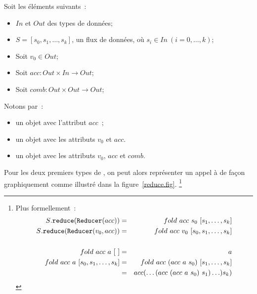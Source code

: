 Soit les \'el\'ements suivants~: 
\begin{itemize}
\item $In$ et $Out$ des types de donn\'ees;

\item $S = [s_0, s_1, \ldots, s_k]$, un flux de donn\'ees, o\`u $s_i
\in In~(i=0, \ldots, k)$;

\item Soit $v_0\in Out$;

\item Soit $acc: Out\times In \rightarrow Out$;

\item Soit $comb: Out\times Out \rightarrow Out$;

\end{itemize}

Notons par~:
\begin{itemize}
\item   {} un objet  avec l'attribut $acc$~; 
\item   {} un objet  avec les attributs $v_0$ et $acc$.
\item   {} un objet  avec les
attributs $v_0$, $acc$ et $comb$.
\end{itemize}

\bigskip

Pour les deux premiers types de , on peut alors
repr\'esenter un appel \`a  de fa\c{c}on graphiquement
comme illustr\'e dans la figure~\ref{reduce.fig}.%
%
\footnote{Plus formellement~:
%
\begin{eqnarray*}
S{\tt .reduce}({\tt Reducer}(acc)) 
  &=& fold\ acc\ s_0\ [s_1, \ldots, s_k]
\\
S{\tt .reduce}({\tt Reducer}(v_0, acc)) 
  &=& fold\ acc\ v_0\ [s_0, s_1, \ldots, s_k]
\\
\\
fold\ acc\ a\ [~]  
  &=& a
\\
fold\ acc\ a\ [s_0, s_1, \ldots, s_k] 
  &=& fold\ acc\ (acc\ a\ s_0)\ [s_1, \ldots, s_k]
\\
  &=& acc (\ldots (acc\ (acc\ a\ s_0)\ s_1) \ldots) s_k)
\end{eqnarray*}
}
 
